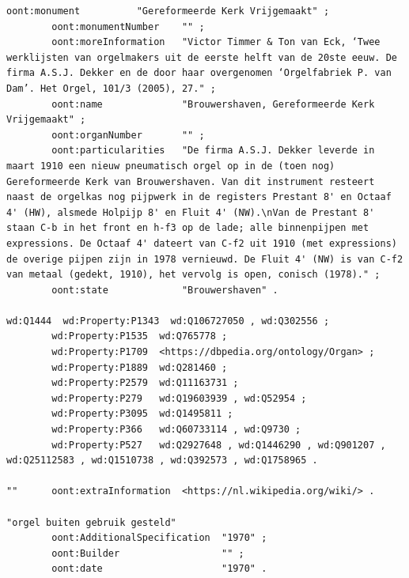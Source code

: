 \begin{lstlisting}[caption={Part14\_000Brouwershaven}]
        oont:monument          "Gereformeerde Kerk Vrijgemaakt" ;
        oont:monumentNumber    "" ;
        oont:moreInformation   "Victor Timmer & Ton van Eck, ‘Twee werklijsten van orgelmakers uit de eerste helft van de 20ste eeuw. De firma A.S.J. Dekker en de door haar overgenomen ‘Orgelfabriek P. van Dam’. Het Orgel, 101/3 (2005), 27." ;
        oont:name              "Brouwershaven, Gereformeerde Kerk Vrijgemaakt" ;
        oont:organNumber       "" ;
        oont:particularities   "De firma A.S.J. Dekker leverde in maart 1910 een nieuw pneumatisch orgel op in de (toen nog) Gereformeerde Kerk van Brouwershaven. Van dit instrument resteert naast de orgelkas nog pijpwerk in de registers Prestant 8' en Octaaf 4' (HW), alsmede Holpijp 8' en Fluit 4' (NW).\nVan de Prestant 8' staan C-b in het front en h-f3 op de lade; alle binnenpijpen met expressions. De Octaaf 4' dateert van C-f2 uit 1910 (met expressions) de overige pijpen zijn in 1978 vernieuwd. De Fluit 4' (NW) is van C-f2 van metaal (gedekt, 1910), het vervolg is open, conisch (1978)." ;
        oont:state             "Brouwershaven" .

wd:Q1444  wd:Property:P1343  wd:Q106727050 , wd:Q302556 ;
        wd:Property:P1535  wd:Q765778 ;
        wd:Property:P1709  <https://dbpedia.org/ontology/Organ> ;
        wd:Property:P1889  wd:Q281460 ;
        wd:Property:P2579  wd:Q11163731 ;
        wd:Property:P279   wd:Q19603939 , wd:Q52954 ;
        wd:Property:P3095  wd:Q1495811 ;
        wd:Property:P366   wd:Q60733114 , wd:Q9730 ;
        wd:Property:P527   wd:Q2927648 , wd:Q1446290 , wd:Q901207 , wd:Q25112583 , wd:Q1510738 , wd:Q392573 , wd:Q1758965 .

""      oont:extraInformation  <https://nl.wikipedia.org/wiki/> .

"orgel buiten gebruik gesteld"
        oont:AdditionalSpecification  "1970" ;
        oont:Builder                  "" ;
        oont:date                     "1970" .
\end{lstlisting} 

